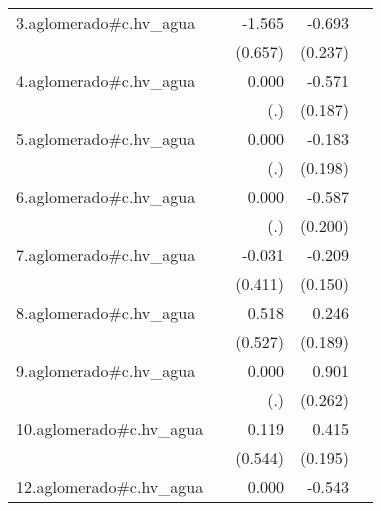 {\begin{longtable}{l*{4}{D{.}{.}{-1}}}
\addlinespace
3.aglomerado#c.hv\_agua&                     &      -1.565\sym{*}  &      -0.693\sym{**} &                     \\
            &                     &     (0.657)         &     (0.237)         &                     \\
\addlinespace
4.aglomerado#c.hv\_agua&                     &       0.000         &      -0.571\sym{**} &                     \\
            &                     &         (.)         &     (0.187)         &                     \\
\addlinespace
5.aglomerado#c.hv\_agua&                     &       0.000         &      -0.183         &                     \\
            &                     &         (.)         &     (0.198)         &                     \\
\addlinespace
6.aglomerado#c.hv\_agua&                     &       0.000         &      -0.587\sym{**} &                     \\
            &                     &         (.)         &     (0.200)         &                     \\
\addlinespace
7.aglomerado#c.hv\_agua&                     &      -0.031         &      -0.209         &                     \\
            &                     &     (0.411)         &     (0.150)         &                     \\
\addlinespace
8.aglomerado#c.hv\_agua&                     &       0.518         &       0.246         &                     \\
            &                     &     (0.527)         &     (0.189)         &                     \\
\addlinespace
9.aglomerado#c.hv\_agua&                     &       0.000         &       0.901\sym{***}&                     \\
            &                     &         (.)         &     (0.262)         &                     \\
\addlinespace
10.aglomerado#c.hv\_agua&                     &       0.119         &       0.415\sym{*}  &                     \\
            &                     &     (0.544)         &     (0.195)         &                     \\
\addlinespace
12.aglomerado#c.hv\_agua&                     &       0.000         &      -0.543\sym{*}  &                     \\

\end{longtable}}
